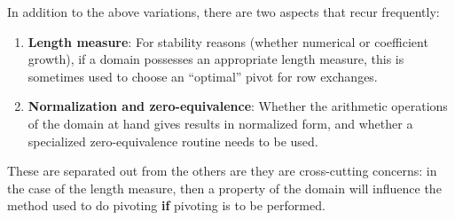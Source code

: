 \documentclass{llncs}
\begin{document}
\noindent In addition to the above variations, there are two aspects that 
recur frequently:
\begin{enumerate}
	\item \textbf{Length measure}:  For stability reasons
		(whether numerical or coefficient growth), if a domain
	  possesses
		an appropriate length measure, this is sometimes used to choose
		an ``optimal'' pivot for row exchanges.
	\item \textbf{Normalization and zero-equivalence}: Whether the 
		arithmetic operations of the domain at hand gives results in 
		normalized form, and whether a specialized zero-equivalence 
		routine needs to be used.
\end{enumerate}
\noindent These are separated out from the others are they are cross-cutting
concerns: in the case of the length measure, then a property of the domain
will influence the method used to do pivoting \textbf{if} pivoting is to be
performed.
\end{document}
